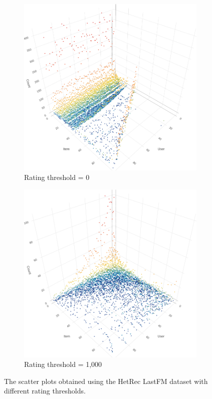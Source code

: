 \begin{figure}
\centering
\begin{subfigure}{.63\textwidth}
\includegraphics[width=\textwidth]{lastfm-t0}
\caption{Rating threshold = 0}
\label{viz:fig:lastfm-t0}
\bigskip
\end{subfigure}
\begin{subfigure}{.63\textwidth}
\includegraphics[width=\textwidth]{lastfm-t1k}
\caption{Rating threshold = 1,000}
\label{viz:fig:lastfm-t1k}
\end{subfigure}
\caption[Scatter plots of LastFM]{The scatter plots obtained using the HetRec LastFM dataset with different rating thresholds.}
\label{viz:fig:lastfm}
\end{figure}

